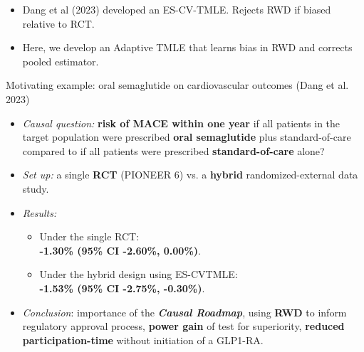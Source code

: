 \documentclass[t]{beamer}
\begin{document}
\begin{frame}
\begin{itemize}
\item Dang et al (2023) developed an ES-CV-TMLE. Rejects RWD if biased relative to RCT.
\item Here, we develop an Adaptive TMLE that learns bias in RWD and corrects pooled estimator.
\end{itemize}
\end{frame}

\begin{frame}{Motivating example: oral semaglutide on cardiovascular outcomes (Dang et al. 2023)}
\small
\begin{itemize}
\item \textit{Causal question:} \textbf{risk of MACE within one year} if all patients in the target population were prescribed \textbf{oral semaglutide} plus standard-of-care compared to if all patients were prescribed \textbf{standard-of-care} alone?
\item \textit{Set up:} a single \textbf{RCT} (PIONEER 6) vs. a \textbf{hybrid} randomized-external data study.
\item \textit{Results:} 
  \begin{itemize}
  \item Under the single RCT: \\ \textbf{-1.30\% (95\% CI -2.60\%, 0.00\%)}. 
  \item Under the hybrid design using ES-CVTMLE: \\ \textbf{-1.53\% (95\% CI -2.75\%, -0.30\%)}.
  \end{itemize}
\item \textit{Conclusion}: importance of the \textbf{\textit{Causal Roadmap}}, using \textbf{RWD} to inform regulatory approval process, \textbf{power gain} of test for superiority, \textbf{reduced participation-time} without initiation of a GLP1-RA.
\end{itemize}
\end{frame}
\end{document}
